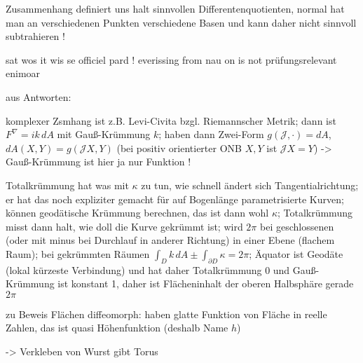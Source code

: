 Zusammenhang definiert uns halt sinnvollen Differentenquotienten, normal hat man an verschiedenen Punkten verschiedene Basen und kann daher nicht sinnvoll subtrahieren !


sat wos it wis se officiel pard ! everissing from nau on is not prüfungsrelevant enimoar




aus Antworten:

komplexer Zsmhang ist z.B. Levi-Civita bzgl. Riemannscher Metrik; dann ist $F^\nabla = i k \, dA$ mit Gauß-Krümmung $k$; haben dann Zwei-Form $g(\mathcal{J}, \cdot) = dA$, $dA(X, Y) = g(\mathcal{J}X, Y)$ (bei positiv orientierter ONB $X, Y$ ist $\mathcal{J}X = Y$) -> Gauß-Krümmung ist hier ja nur Funktion !

Totalkrümmung hat was mit $\kappa$ zu tun, wie schnell ändert sich Tangentialrichtung; er hat das noch expliziter gemacht für auf Bogenlänge parametrisierte Kurven; können geodätische Krümmung berechnen, das ist dann wohl $\kappa$; Totalkrümmung misst dann halt, wie doll die Kurve gekrümmt ist; wird $2\pi$ bei geschlossenen (oder mit minus bei Durchlauf in anderer Richtung) in einer Ebene (flachem Raum); bei gekrümmten Räumen $\int_D k \, dA \pm \int_{\partial D} \kappa = 2\pi$; Äquator ist Geodäte (lokal kürzeste Verbindung) und hat daher Totalkrümmung 0 und Gauß-Krümmung ist konstant 1, daher ist Flächeninhalt der oberen Halbsphäre gerade $2\pi$


zu Beweis Flächen diffeomorph: haben glatte Funktion von Fläche in reelle Zahlen, das ist quasi Höhenfunktion (deshalb Name $h$)


-> Verkleben von Wurst gibt Torus


 
